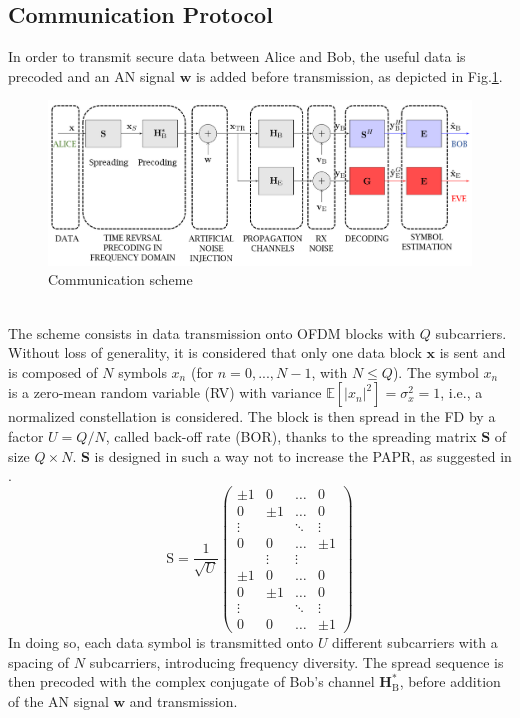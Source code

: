 \documentclass[12pt, draftclsnofoot, onecolumn]{IEEEtran}
\let\MYoriglatexcaption\caption
\renewcommand{\caption}[2][\relax]{\MYoriglatexcaption[#2]{#2}}
\newcommand{\EX}[1]{\mathbb{E} \left[#1\right]}%
\newcommand{\HB}{\textbf{H}_{\text{B}}}
\newcommand{\spread}{\textbf{S}}
\newcommand{\w}{\textbf{w}}
\newcommand{\mat}[1]{\boldsymbol{\mathrm{#1}}}
\begin{document}
\subsection{Communication Protocol}\label{sec:communication-protocol}
In order to transmit secure data between Alice and Bob, the useful data is precoded and an AN signal $\w$ is added before transmission, as depicted in Fig.\ref{fig_com_scheme}.  
\begin{figure}[h!t]
	\centering
	\includegraphics[width=0.75\linewidth]{graphs/com_scheme_an.PNG}
	\caption{Communication scheme}
	\label{fig_com_scheme}
\end{figure}\\
The scheme consists in data transmission onto OFDM blocks with $Q$ subcarriers. Without loss of generality, it is considered that only one data block $\textbf{x}$ is sent and is composed of $N$ symbols $x_n$ (for $n = 0,..., N-1$, with $N\leq Q$). The symbol $x_n$ is  a zero-mean random variable (RV) with variance $\EX{|x_n|^2} = \sigma_x^2 = 1$, i.e., a normalized constellation is considered. The block is then spread in the FD by a factor $U = Q/N$, called back-off rate (BOR), thanks to the spreading matrix $\spread$ of size $Q\times N$. \textbf{S} is designed in such a way not to increase the PAPR, as suggested in \cite{4394231}.
\begin{equation}
\mat{S} = \frac{1}{\sqrt{U}} 
\begin{pmatrix}
\pm 1 & 0 & \hdots & 0 \\
0 & \pm 1 & \hdots & 0 \\
\vdots & & \ddots & \vdots \\
0 & 0 & \hdots & \pm 1 \\
& \vdots& \vdots& \\
\pm 1 & 0 & \hdots & 0 \\
0 & \pm 1 & \hdots & 0 \\
\vdots & & \ddots & \vdots \\
0 & 0 & \hdots & \pm 1
\end{pmatrix}
\label{eq:spread_mat}
\end{equation}
In doing so, each data symbol is transmitted onto $U$ different subcarriers with a spacing of $N$ subcarriers, introducing frequency diversity. The spread sequence is then precoded with the complex conjugate of Bob's channel $\HB^*$, before addition of the AN signal $\textbf{w}$  and transmission. 
\end{document}

